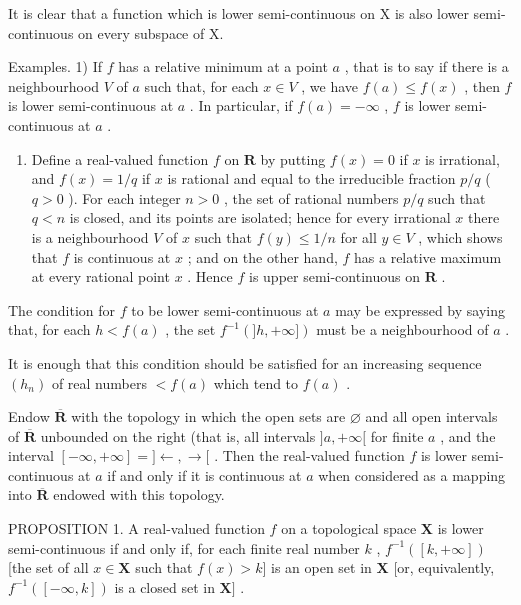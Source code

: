 It is clear that a function which is lower semi-continuous on X is also lower semi-continuous on every subspace of X.

Examples. 1) If \(f\) has a relative minimum at a point \(a\) , that is to say if there is a neighbourhood \(V\) of \(a\) such that, for each \(x \in V\) , we have \(f(a) \leqslant f(x)\) , then \(f\) is lower semi-continuous at \(a\) . In particular, if \(f(a) = -\infty\) , \(f\) is lower semi-continuous at \(a\) .

\begin{enumerate}
\def\labelenumi{\arabic{enumi})}
\setcounter{enumi}{1}
\tightlist
\item
  Define a real-valued function \(f\) on \(\mathbf{R}\) by putting \(f(x) = 0\) if \(x\) is irrational, and \(f(x) = 1 / q\) if \(x\) is rational and equal to the irreducible fraction \(p / q\) ( \(q > 0\) ). For each integer \(n > 0\) , the set of rational numbers \(p / q\) such that \(q < n\) is closed, and its points are isolated; hence for every irrational \(x\) there is a neighbourhood \(V\) of \(x\) such that \(f(y) \leqslant 1 / n\) for all \(y \in V\) , which shows that \(f\) is continuous at \(x\) ; and on the other hand, \(f\) has a relative maximum at every rational point \(x\) . Hence \(f\) is upper semi-continuous on \(\mathbf{R}\) .
\end{enumerate}

The condition for \(f\) to be lower semi-continuous at \(a\) may be expressed by saying that, for each \(h < f(a)\) , the set \(f^{-1}(]h, +\infty])\) must be a neighbourhood of \(a\) .

It is enough that this condition should be satisfied for an increasing sequence \((h_{n})\) of real numbers \(<f(a)\) which tend to \(f(a)\) .

Endow \(\overline{\mathbf{R}}\) with the topology in which the open sets are \(\varnothing\) and all open intervals of \(\overline{\mathbf{R}}\) unbounded on the right (that is, all intervals \(]a, +\infty[\) for finite \(a\) , and the interval \([- \infty, +\infty] = ] \leftarrow, \rightarrow[\) . Then the real-valued function \(f\) is lower semi-continuous at \(a\) if and only if it is continuous at \(a\) when considered as a mapping into \(\overline{\mathbf{R}}\) endowed with this topology.

PROPOSITION 1. A real-valued function \(f\) on a topological space \(\mathbf{X}\) is lower semi-continuous if and only if, for each finite real number \(k\) , \(f^{-1}([k, +\infty])\) {[}the set of all \(x \in \mathbf{X}\) such that \(f(x) > k]\) is an open set in \(\mathbf{X}\) {[}or, equivalently, \(f^{-1}([- \infty, k])\) is a closed set in \(\mathbf{X}]\) .

